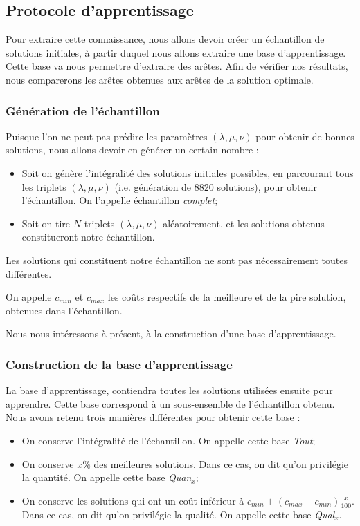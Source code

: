 \documentclass[a4paper,11pt]{article}%
\begin{document}
\subsection{Protocole d'apprentissage}
Pour extraire cette connaissance, nous allons devoir créer un échantillon de solutions initiales, à partir duquel nous allons extraire une base d'apprentissage. Cette base va nous permettre d'extraire des arêtes. Afin de vérifier nos résultats, nous comparerons les arêtes obtenues aux arêtes de la solution optimale.

\subsubsection{Génération de l'échantillon}
Puisque l'on ne peut pas prédire les paramètres $(\lambda,\mu,\nu)$ pour obtenir de bonnes solutions, nous allons devoir en générer un certain nombre :

\begin{itemize}
\item Soit on génère l'intégralité des solutions initiales possibles, en parcourant tous les triplets $(\lambda,\mu,\nu)$ (i.e. génération de 8820 solutions), pour obtenir l'échantillon. On l'appelle échantillon \emph{complet};
\item Soit on tire $N$ triplets $(\lambda,\mu,\nu)$ aléatoirement, et les solutions obtenus constitueront notre échantillon. 
\end{itemize}

Les solutions qui constituent notre échantillon ne sont pas nécessairement toutes différentes.

On appelle $c_{min}$ et $c_{max}$ les coûts respectifs de la meilleure et de la pire solution, obtenues dans l'échantillon. 

Nous nous intéressons à présent, à la construction d'une base d'apprentissage.

\subsubsection{Construction de la base d'apprentissage}
La base d'apprentissage, contiendra toutes les solutions utilisées ensuite pour apprendre. Cette base correspond à un sous-ensemble de l'échantillon obtenu. 
Nous avons retenu trois manières différentes pour obtenir cette base :

\begin{itemize}
\item On conserve l'intégralité de l'échantillon. On appelle cette base \emph{Tout};
\item On conserve $x\%$ des meilleures solutions. Dans ce cas, on dit qu'on privilégie la quantité. On appelle cette base \emph{Quan$_x$};
\item On conserve les solutions qui ont un coût inférieur à $c_{min} + (c_{max}-c_{min})\frac{x}{100}$. Dans ce cas, on dit qu'on privilégie la qualité. On appelle cette base \emph{Qual$_x$}.
\end{itemize}
\end{document}
